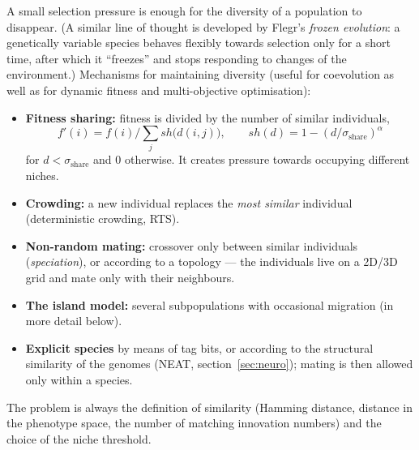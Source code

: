 \documentclass[11pt,a4paper]{article}
\theoremstyle{definition}
\providecommand{\uv}[1]{``#1''}
\begin{document}
A small selection pressure is enough for the diversity of a population to
disappear. (A similar line of thought is developed by Flegr's \emph{frozen
evolution}: a genetically variable species behaves flexibly towards selection
only for a short time, after which it \uv{freezes} and stops responding to
changes of the environment.) Mechanisms for maintaining diversity (useful for
coevolution as well as for dynamic fitness and multi-objective optimisation):
\begin{itemize}
\item \textbf{Fitness sharing:} fitness is divided by the number of similar
  individuals,
  \[
  f'(i) = f(i)\Big/\sum_j sh\big(d(i,j)\big),
  \qquad
  sh(d) = 1-(d/\sigma_{\mathrm{share}})^{\alpha}
  \]
  for $d < \sigma_{\mathrm{share}}$ and 0 otherwise. It creates pressure
  towards occupying different niches.
\item \textbf{Crowding:} a new individual replaces the \emph{most similar}
  individual (deterministic crowding, RTS).
\item \textbf{Non-random mating:} crossover only between similar individuals
  (\emph{speciation}), or according to a topology --- the individuals live on a
  2D/3D grid and mate only with their neighbours.
\item \textbf{The island model:} several subpopulations with occasional
  migration (in more detail below).
\item \textbf{Explicit species} by means of tag bits, or according to the
  structural similarity of the genomes (NEAT, section~\ref{sec:neuro}); mating
  is then allowed only within a species.
\end{itemize}
The problem is always the definition of similarity (Hamming distance, distance
in the phenotype space, the number of matching innovation numbers) and the
choice of the niche threshold.
\end{document}
